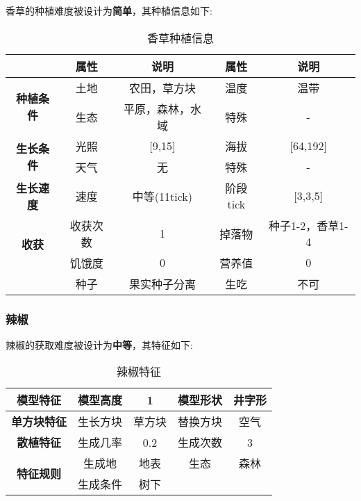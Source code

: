 香草的种植难度被设计为\textbf{简单}，其种植信息如下:

\begin{table}[H]
    \centering
    \caption{香草种植信息}
    \label{table:香草种植信息}
    \setlength{\tabcolsep}{4mm}
    \begin{tabular}{c|cc|cc}
        \toprule
                                           & \textbf{属性} & \textbf{说明}    & \textbf{属性} & \textbf{说明}    \\
        \midrule
        \multirow{2}{*}{\textbf{种植条件}} & 土地          & 农田，草方块     & 温度          & 温带             \\
                                           & 生态          & 平原，森林，水域 & 特殊          & -                \\
        \midrule
        \multirow{2}{*}{\textbf{生长条件}} & 光照          & [9,15]           & 海拔          & [64,192]         \\
                                           & 天气          & 无               & 特殊          & -                \\
        \midrule
        \textbf{生长速度}                  & 速度          & 中等(11tick)     & 阶段tick      & [3,3,5]          \\
        \midrule
        \multirow{2}{*}{\textbf{收获}}     & 收获次数      & 1                & 掉落物        & 种子1-2，香草1-4 \\
                                           & 饥饿度        & 0                & 营养值        & 0                \\
                                           & 种子 & 果实种子分离 & 生吃 & 不可 \\
        \bottomrule
    \end{tabular}
\end{table}

\subsubsection{辣椒}

辣椒的获取难度被设计为\textbf{中等}，其特征如下:
\begin{table}[H]
    \centering
    \caption{辣椒特征}
    \label{table:辣椒特征}
    \setlength{\tabcolsep}{4mm}
    \begin{tabular}{c|cc|cc}
        \toprule
        \textbf{模型特征}                  & 模型高度 & 1      & 模型形状 & 井字形 \\
        \midrule
        \textbf{单方块特征}                & 生长方块 & 草方块 & 替换方块 & 空气   \\
        \midrule
        \textbf{散植特征}                  & 生成几率 & 0.2    & 生成次数 & 3      \\
        \midrule
        \multirow{2}{*}{\textbf{特征规则}} & 生成地   & 地表   & 生态     & 森林   \\
                                           & 生成条件 & 树下                       \\
        \bottomrule
    \end{tabular}
\end{table}


